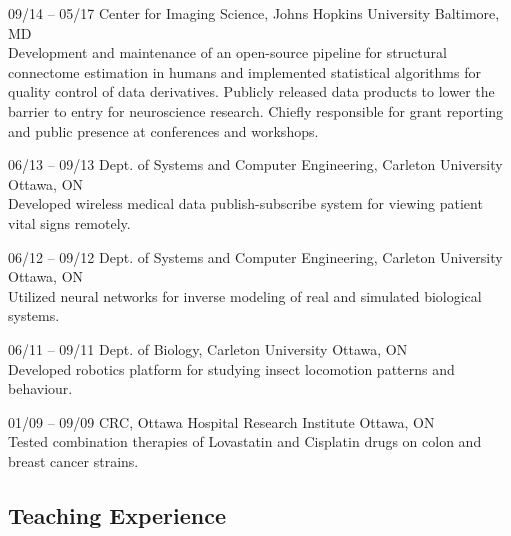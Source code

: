 \documentclass[]{friggeri-cv} %
\begin{document}
\begin{entrylist}
\entry
{09/14 -- 05/17}
{Center for Imaging Science, Johns Hopkins University}
{Baltimore, MD}
{\\
Development and maintenance of an open-source pipeline for structural connectome estimation in humans
and implemented statistical algorithms for quality control of data derivatives. Publicly released data
products to lower the barrier to entry for neuroscience research. Chiefly responsible for grant reporting
and public presence at conferences and workshops.}

\entry
{06/13 -- 09/13}
{Dept. of Systems and Computer Engineering, Carleton University}
{Ottawa, ON}
{\\
Developed wireless medical data publish-subscribe system for viewing patient vital signs remotely.}

\entry
{06/12 -- 09/12}
{Dept. of Systems and Computer Engineering, Carleton University}
{Ottawa, ON}
{\\
Utilized neural networks for inverse modeling of real and simulated biological systems.}

\entry
{06/11 -- 09/11}
{Dept. of Biology, Carleton University}
{Ottawa, ON}
{\\
Developed robotics platform for studying insect locomotion patterns and behaviour.}

\entry
{01/09 -- 09/09}
{CRC, Ottawa Hospital Research Institute}
{Ottawa, ON}
{\\
Tested combination therapies of Lovastatin and Cisplatin drugs on colon and breast cancer strains.}
\end{entrylist}

\subsection{Teaching Experience}
\end{document}

